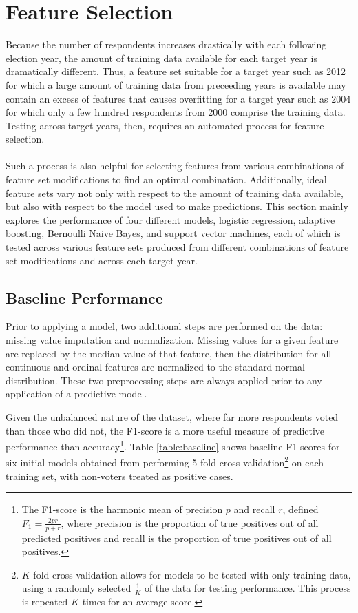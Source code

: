 \documentclass{article}
\begin{document}
	\section{Feature Selection}
	
	Because the number of respondents increases drastically with each following election year, the amount of training data available for each target year is dramatically different. Thus, a feature set suitable for a target year such as 2012 for which a large amount of training data from preceeding years is available may contain an excess of features that causes overfitting for a target year such as 2004 for which only a few hundred respondents from 2000 comprise the training data. Testing across target years, then, requires an automated process for feature selection.
	\\\\
	Such a process is also helpful for selecting features from various combinations of feature set modifications to find an optimal combination. Additionally, ideal feature sets vary not only with respect to the amount of training data available, but also with respect to the model used to make predictions. This section mainly explores the performance of four different models, logistic regression, adaptive boosting, Bernoulli Naive Bayes, and support vector machines, each of which is tested across various feature sets produced from different combinations of feature set modifications and across each target year.
	
	\subsection{Baseline Performance}
	
	Prior to applying a model, two additional steps are performed on the data: missing value imputation and normalization. Missing values for a given feature are replaced by the median value of that feature, then the distribution for all continuous and ordinal features are normalized to the standard normal distribution. These two preprocessing steps are always applied prior to any application of a predictive model. 
	
	Given the unbalanced nature of the dataset, where far more respondents voted than those who did not, the F1-score is a more useful measure of predictive performance than accuracy\footnote{The F1-score is the harmonic mean of precision $p$ and recall $r$, defined $F_1 = \frac{2pr}{p+r}$, where precision is the proportion of true positives out of all predicted positives and recall is the proportion of true positives out of all positives.}. Table \ref{table:baseline} shows baseline F1-scores for six initial models obtained from performing 5-fold cross-validation\footnote{$K$-fold cross-validation allows for models to be tested with only training data, using a randomly selected $\frac{1}{K}$ of the data for testing performance. This process is repeated $K$ times for an average score.} on each training set, with non-voters treated as positive cases.
	
\end{document}
